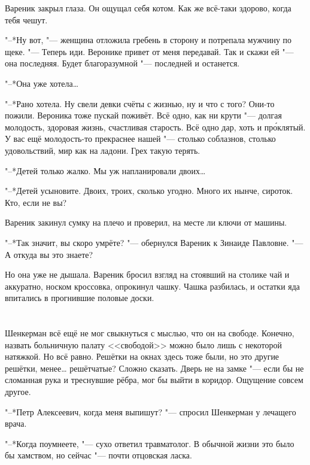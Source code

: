 Вареник закрыл глаза.
Он ощущал себя котом.
Как же всё-таки здорово, когда тебя чешут.

"--*Ну вот, "--- женщина отложила гребень в сторону и потрепала мужчину по щеке.
"--- Теперь иди.
Веронике привет от меня передавай.
Так и скажи ей "--- она последняя.
Будет благоразумной "--- последней и останется.

"--*Она уже хотела\dots{}

"--*Рано хотела.
Ну свели девки счёты с жизнью, ну и что с того?
Они-то пожили.
Вероника тоже пускай поживёт.
Всё одно, как ни крути "--- долгая молодость, здоровая жизнь, счастливая старость.
Всё одно дар, хоть и пр\'оклятый.
У вас ещё молодость-то прекраснее нашей "--- столько соблазнов, столько удовольствий, мир как на ладони.
Грех такую терять.

"--*Детей только жалко.
Мы уж напланировали двоих\dots{}

"--*Детей усыновите.
Двоих, троих, сколько угодно.
Много их нынче, сироток.
Кто, если не вы?

Вареник закинул сумку на плечо и проверил, на месте ли ключи от машины.

"--*Так значит, вы скоро умрёте? "--- обернулся Вареник к Зинаиде Павловне.
"--- А откуда вы это знаете?

Но она уже не дышала.
Вареник бросил взгляд на стоявший на столике чай и аккуратно, носком кроссовка, опрокинул чашку.
Чашка разбилась, и остатки яда впитались в прогнившие половые доски.

\chapter{}

\textspace

Шенкерман всё ещё не мог свыкнуться с мыслью, что он на свободе.
Конечно, назвать больничную палату <<свободой>> можно было лишь с некоторой натяжкой.
Но всё равно.
Решётки на окнах здесь тоже были, но это другие решётки, менее\dots{} решётчатые?
Сложно сказать.
Дверь не на замке "--- если бы не сломанная рука и треснувшие рёбра, мог бы выйти в коридор.
Ощущение совсем другое.

"--*Петр Алексеевич, когда меня выпишут? "--- спросил Шенкерман у лечащего врача.

"--*Когда поумнеете, "--- сухо ответил травматолог.
В обычной жизни это было бы хамством, но сейчас "--- почти отцовская ласка.

